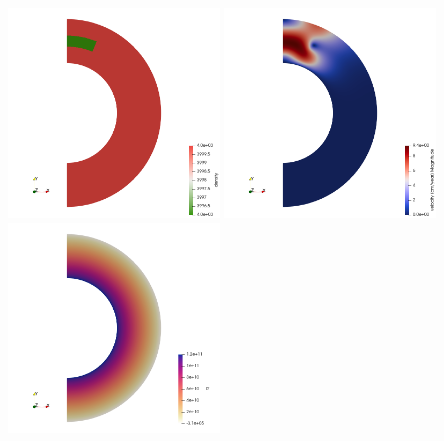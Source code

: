\begin{center}
\includegraphics[width=5.6cm]{python_codes/fieldstone_152/RESULTS/exp3/rho}
\includegraphics[width=5.6cm]{python_codes/fieldstone_152/RESULTS/exp3/vel}
\includegraphics[width=5.6cm]{python_codes/fieldstone_152/RESULTS/exp3/press}
\end{center}

